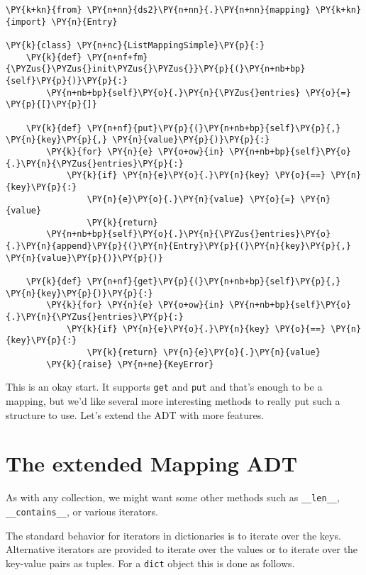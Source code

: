 \begin{Verbatim}[commandchars=\\\{\}]
\PY{k+kn}{from} \PY{n+nn}{ds2}\PY{n+nn}{.}\PY{n+nn}{mapping} \PY{k+kn}{import} \PY{n}{Entry}

\PY{k}{class} \PY{n+nc}{ListMappingSimple}\PY{p}{:}
    \PY{k}{def} \PY{n+nf+fm}{\PYZus{}\PYZus{}init\PYZus{}\PYZus{}}\PY{p}{(}\PY{n+nb+bp}{self}\PY{p}{)}\PY{p}{:}
        \PY{n+nb+bp}{self}\PY{o}{.}\PY{n}{\PYZus{}entries} \PY{o}{=} \PY{p}{[}\PY{p}{]}

    \PY{k}{def} \PY{n+nf}{put}\PY{p}{(}\PY{n+nb+bp}{self}\PY{p}{,} \PY{n}{key}\PY{p}{,} \PY{n}{value}\PY{p}{)}\PY{p}{:}
        \PY{k}{for} \PY{n}{e} \PY{o+ow}{in} \PY{n+nb+bp}{self}\PY{o}{.}\PY{n}{\PYZus{}entries}\PY{p}{:}
            \PY{k}{if} \PY{n}{e}\PY{o}{.}\PY{n}{key} \PY{o}{==} \PY{n}{key}\PY{p}{:}
                \PY{n}{e}\PY{o}{.}\PY{n}{value} \PY{o}{=} \PY{n}{value}
                \PY{k}{return}
        \PY{n+nb+bp}{self}\PY{o}{.}\PY{n}{\PYZus{}entries}\PY{o}{.}\PY{n}{append}\PY{p}{(}\PY{n}{Entry}\PY{p}{(}\PY{n}{key}\PY{p}{,} \PY{n}{value}\PY{p}{)}\PY{p}{)}

    \PY{k}{def} \PY{n+nf}{get}\PY{p}{(}\PY{n+nb+bp}{self}\PY{p}{,} \PY{n}{key}\PY{p}{)}\PY{p}{:}
        \PY{k}{for} \PY{n}{e} \PY{o+ow}{in} \PY{n+nb+bp}{self}\PY{o}{.}\PY{n}{\PYZus{}entries}\PY{p}{:}
            \PY{k}{if} \PY{n}{e}\PY{o}{.}\PY{n}{key} \PY{o}{==} \PY{n}{key}\PY{p}{:}
                \PY{k}{return} \PY{n}{e}\PY{o}{.}\PY{n}{value}
        \PY{k}{raise} \PY{n+ne}{KeyError}
\end{Verbatim}



This is an okay start.  It supports \texttt{get} and \texttt{put} and that's enough to be a mapping, but we'd like several more interesting methods to really put such a structure to use.  Let's extend the ADT with more features.

\section{The extended Mapping ADT}


As with any collection, we might want some other methods such as \texttt{\_\_len\_\_}, \texttt{\_\_contains\_\_}, or various iterators.  


The standard behavior for iterators in dictionaries is to iterate over the keys.  Alternative iterators are provided to iterate over the values or to iterate over the key-value pairs as tuples.  For a \texttt{dict} object this is done as follows.



